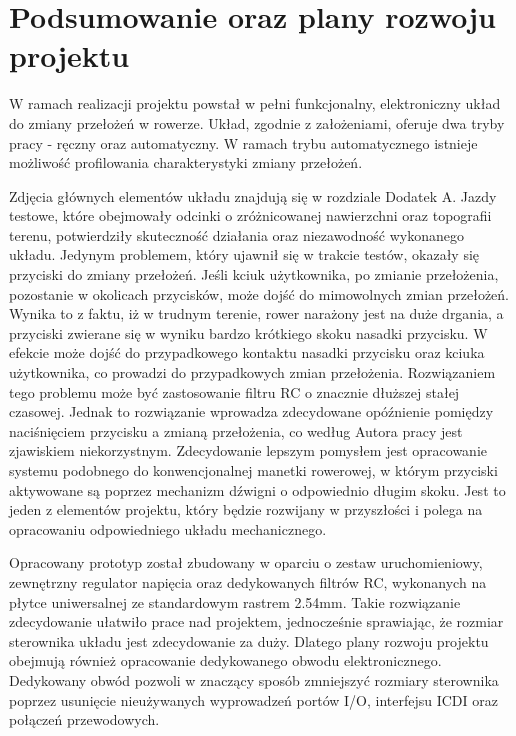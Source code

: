 \chapter{Podsumowanie oraz plany rozwoju projektu}

W ramach realizacji projektu powstał w pełni funkcjonalny, elektroniczny układ do zmiany przełożeń w rowerze. Układ, zgodnie z założeniami, oferuje dwa tryby pracy - ręczny oraz automatyczny. W ramach trybu automatycznego istnieje możliwość profilowania charakterystyki zmiany przełożeń.

Zdjęcia głównych elementów układu znajdują się w rozdziale Dodatek A. Jazdy testowe, które obejmowały odcinki o zróżnicowanej nawierzchni oraz topografii terenu, potwierdziły skuteczność działania oraz niezawodność wykonanego układu. Jedynym problemem, który ujawnił się w trakcie testów, okazały się przyciski do zmiany przełożeń. Jeśli kciuk użytkownika, po zmianie przełożenia, pozostanie w okolicach przycisków, może dojść do mimowolnych zmian przełożeń. Wynika to z faktu, iż w trudnym terenie, rower narażony jest na duże drgania, a przyciski zwierane się w wyniku bardzo krótkiego skoku nasadki przycisku. W efekcie może dojść do przypadkowego kontaktu nasadki przycisku oraz kciuka użytkownika, co prowadzi do przypadkowych zmian przełożenia. Rozwiązaniem tego problemu może być zastosowanie filtru RC o znacznie dłuższej stałej czasowej. Jednak to rozwiązanie wprowadza zdecydowane opóźnienie pomiędzy naciśnięciem przycisku a zmianą przełożenia, co według Autora pracy jest zjawiskiem niekorzystnym. Zdecydowanie lepszym pomysłem jest opracowanie systemu podobnego do konwencjonalnej manetki rowerowej, w którym przyciski aktywowane są poprzez mechanizm dźwigni o odpowiednio długim skoku. Jest to jeden z elementów projektu, który będzie rozwijany w przyszłości i polega na opracowaniu odpowiedniego układu mechanicznego.

Opracowany prototyp został zbudowany w oparciu o zestaw uruchomieniowy, zewnętrzny regulator napięcia oraz dedykowanych filtrów RC, wykonanych na płytce uniwersalnej ze standardowym rastrem 2.54mm. Takie rozwiązanie zdecydowanie ułatwiło prace nad projektem, jednocześnie sprawiając, że rozmiar sterownika układu jest zdecydowanie za duży. Dlatego plany rozwoju projektu obejmują również opracowanie dedykowanego obwodu elektronicznego. Dedykowany obwód pozwoli w znaczący sposób zmniejszyć rozmiary sterownika poprzez usunięcie nieużywanych wyprowadzeń portów I/O, interfejsu ICDI oraz połączeń przewodowych.

